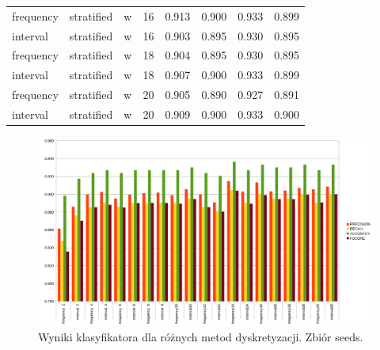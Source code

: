 \begin{table}[H]
\begin{tabular}{llllrrrr}
frequency & stratified & w   & 16   & 0.913     & 0.900  & 0.933    & 0.899  \\
interval  & stratified & w   & 16   & 0.903     & 0.895  & 0.930    & 0.895  \\
frequency & stratified & w   & 18   & 0.904     & 0.895  & 0.930    & 0.895  \\
interval  & stratified & w   & 18   & 0.907     & 0.900  & 0.933    & 0.899  \\
frequency & stratified & w   & 20   & 0.905     & 0.890  & 0.927    & 0.891  \\
interval  & stratified & w   & 20   & 0.909     & 0.900  & 0.933    & 0.900 
\end{tabular}
\end{table}

\begin{figure}[H]
	\centering
		\includegraphics[width=1.0\linewidth]{disc_seeds.png}
	\caption[Wyniki klasyfikatora dla różnych metod dyskretyzacji. Zbiór seeds.]{Wyniki klasyfikatora dla różnych metod dyskretyzacji. Zbiór seeds.}
	\label{fig:disc_seeds}
\end{figure}

